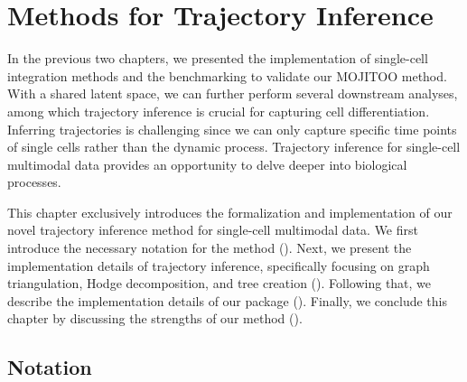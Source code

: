 %
\chapter{Methods for Trajectory Inference}
\label{chapter:methods_TI}
\graphicspath{{chapter5/figs}}

In the previous two chapters, we presented the implementation of single-cell integration methods and the benchmarking to validate our MOJITOO method. With a shared latent space, we can further perform several downstream analyses, among which trajectory inference is crucial for capturing cell differentiation. Inferring trajectories is challenging since we can only capture specific time points of single cells rather than the dynamic process. Trajectory inference for single-cell multimodal data provides an opportunity to delve deeper into biological processes.

This chapter exclusively introduces the formalization and implementation of our novel trajectory inference method for single-cell multimodal data. We first introduce the necessary notation for the method (). Next, we present the implementation details of trajectory inference, specifically focusing on graph triangulation, Hodge decomposition, and tree creation (). Following that, we describe the implementation details of our package (). Finally, we conclude this chapter by discussing the strengths of our method ().


\section{Notation} \label{TI_methods:notation}

